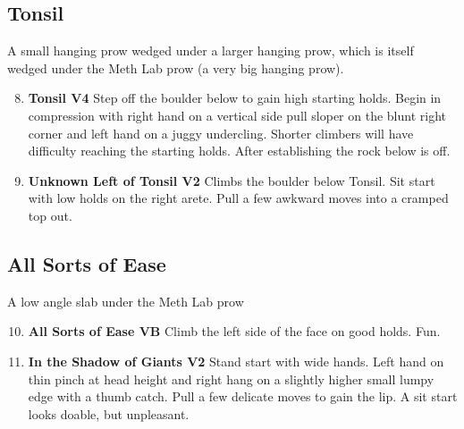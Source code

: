\begin{multicols*}{2}
			\subsection*{Tonsil}\label{bf:Tonsil}
			A small hanging prow wedged under a larger hanging prow, which is itself wedged under the Meth Lab prow (a very big hanging prow).
			
				\begin{enumerate}[]
					\setcounter{enumi}{7}
					\item\label{rt:Tonsil} \colorbox{RoyalBlue!20}{\textbf{Tonsil V4 \ding{72}   } }
					\newline Step off the boulder below to gain high starting holds. Begin in compression with right hand on a vertical side pull sloper on the blunt right corner and left hand on a juggy undercling.  Shorter climbers will have difficulty reaching the starting holds. After establishing the rock below is off.\
					\setcounter{enumi}{8}
					\item\label{rt:Unknown Left of Tonsil} \colorbox{green!20}{\textbf{Unknown Left of Tonsil V2 \ding{73} } }
					\newline Climbs the boulder below Tonsil. Sit start with low holds on the right arete. Pull a few awkward moves into a cramped top out.\
				\end{enumerate}
			\subsection*{All Sorts of Ease}\label{bf:All Sorts of Ease}
			A low angle slab under the Meth Lab prow
			
				\begin{enumerate}[]
					\setcounter{enumi}{9}
					\item\label{rt:All Sorts of Ease} \colorbox{green!20}{\textbf{All Sorts of Ease VB    } }
					\newline Climb the left side of the face on good holds. Fun.\
					\setcounter{enumi}{10}
					\item\label{rt:In the Shadow of Giants} \colorbox{green!20}{\textbf{In the Shadow of Giants V2   } }
					\newline Stand start with wide hands. Left hand on thin pinch at head height and right hang on a slightly higher small lumpy edge with a thumb catch. Pull a few delicate moves to gain the lip. A sit start looks doable, but unpleasant.\
				\end{enumerate}


\end{multicols*}
